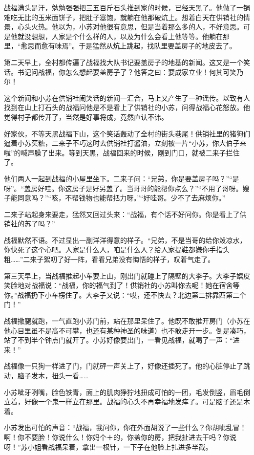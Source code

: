 战福满头是汗，勉勉强强把三五百斤石头推到家的时候，已经天黑了。他做了一锅难吃无比的玉米面饼子，把肚子塞饱，就躺在他那破炕上。想着白天在供销社的情景，心头火热。他以为，小苏对他很有意思，但是当着那么多的人，不好意思。可是他就没想想，人家是个什么样的人，以及为什么会看上他等等。他躺在那里，“愈思而愈有味焉”。于是猛然从炕上跳起，找队里要盖房子的地皮去了。 

第二天早上，全村都传遍了战福找大队书记要盖房子的地基的新闻。这又是一个笑话。书记问战福，你怎么想起要盖房子了？他答之曰：要成家立业！何其可笑乃尔！ 

这个新闻和小苏在供销社闹笑话的新闻一汇合，马上又产生了一种谣传。以致有人找到在山上打石头的战福问他是不是看上了供销社的小苏，问得战福心花怒放。他觉得村子都传开了，当然是好事将成，竟然直认不讳。 

好家伙，不等天黑战福下山，这个笑话轰动了全村的街头巷尾！供销社里的猪狗们逼着小苏买糖，二来子不巧这时去供销社打酱油，立刻被一片“小苏，你大伯子来啦”的喊声臊了出来。等到天黑，战福回来的时候，刚到门口，就被二来子拦住了。 

他们两人一起到战福的小屋里坐下。二来子问：“兄弟，你是要盖房子吗？”“是呀”。“盖房好哇。你这房子是好另盖了。当哥哥的能帮你点么？”“不用了哥呀。嫂子能同意吗？”“咳，不帮钱物也能帮把力呀。”“好哇哥。少不了去麻烦你。” 

二来子站起身来要走，猛然又回过头来：“战福，有个话不好问你。你是看上了供销社的苏了吗？” 

战福默然不语。不过显出一副洋洋得意的样子。“兄弟，不是当哥的给你泼凉水，你快死了这个心吧。人家是什么人，咱是什么人？给人家提鞋都嫌你手指头粗……”二来子絮叨了好一阵，看看兄弟没有悔悟的样子，叹着气走了。 

第三天早上，当战福推起小车要上山，刚出门就碰上了隔壁的大李子。大李子嬉皮笑脸地对战福说：“战福，你的福气到了！供销社的小苏叫你去呢！她在宿舍等你。”战福扔下小车楞住了。大李子又说：“哎，还不快去？北边第二排靠西第二个门！” 

战福撒腿就跑，一气直跑小苏门前，站在那里呆住了。他既不敢推开房门（小苏在他心目里虽不是高不可攀，也还有某种神圣的味道）也不敢走开一步。倒是凑巧，站了不到半个钟点门就开了。小苏好像要出门，一看见战福，就喝了一声：“进来！” 

战福像一只狗一样进了门，门就砰一声关上了，好像还插死了。他的心脏停止了跳动，脑子发木，扭头一看…… 

小苏呲牙咧嘴，脸色铁青，面上的肌肉狰狞地扭成可怕的一团，毛发倒竖，眉毛倒立着，好像一个鬼一样立在那里。战福的心头不再幸福地发痒了。可是脑子还是木着。 

小苏发出可怕的声音：“战福，我问你，你在外面胡说了一些什么？你胡呲乱冒！啊！你不要脸！你说什么！你妈个＋的，你盖你的房，把我扯进去干吗？你说呀！”苏小姐看战福呆着，拿出一根针，一下子在他脸上扎进多半截。 

